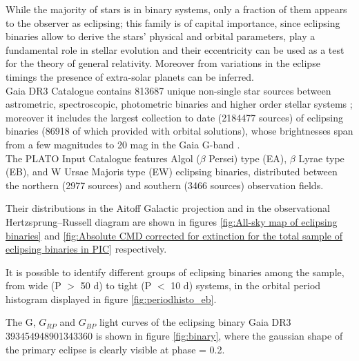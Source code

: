 While the majority of stars is in binary systems, only a fraction of them appears to the observer as eclipsing; this family is of capital importance, since eclipsing binaries allow to derive the stars' physical and orbital parameters, play a fundamental role in stellar evolution and their eccentricity can be used as a test for the theory of general relativity.
Moreover from variations in the eclipse timings the presence of extra-solar planets can be inferred.\\
Gaia DR3 Catalogue contains 813687 unique non-single star sources between astrometric, spectroscopic, photometric binaries and higher order stellar systems \parencite{arenou}; moreover it includes the largest collection to date (2184477 sources) of eclipsing binaries (86918 of which provided with orbital solutions), whose brightnesses span from a few magnitudes to 20 mag in the Gaia G-band \parencite{mowlavi2022gaia}.\\
The PLATO Input Catalogue features Algol ($\beta$ Persei) type (EA), $\beta$ Lyrae type (EB), and W Ursae Majoris type (EW) eclipsing binaries, distributed between the northern (2977 sources) and southern (3466 sources) observation fields.

Their distributions in the Aitoff Galactic projection and in the observational Hertzsprung–Russell diagram are shown in figures \ref{fig:All-sky map of eclipsing binaries} and \ref{fig:Absolute CMD corrected for extinction for the total sample of eclipsing binaries in PIC} respectively.

It is possible to identify different groups of eclipsing binaries among the sample, from wide (P $>$ 50 d) to tight (P $<$ 10 d) systems, in the orbital period histogram displayed in figure \ref{fig:periodhisto_eb}.

The G, $G_{RP}$ and $G_{BP}$ light curves of the eclipsing binary Gaia DR3 393454948901343360 is shown in figure \ref{fig:binary}, where the gaussian shape of the primary eclipse is clearly visible at phase = 0.2.



